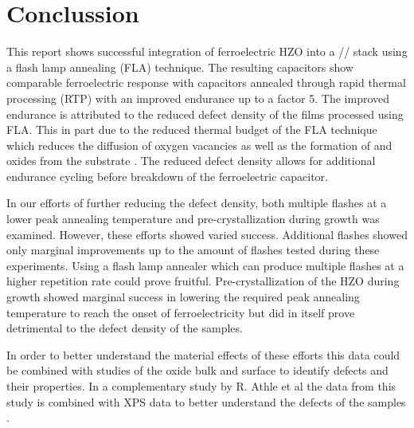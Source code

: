 \documentclass[11pt,twoside,final]{eitExjobb}  %
\begin{document}
\chapter{Conclussion}\label{chap:conc}

This report shows successful integration of ferroelectric HZO into a
// stack using a flash lamp annealing (FLA) technique. The
resulting capacitors show comparable ferroelectric response with capacitors
annealed through rapid thermal processing (RTP) with an improved endurance up
to a factor 5. The improved endurance is attributed to the reduced defect
density of the films processed using FLA. This in part due to the reduced
thermal budget of the FLA technique which reduces the diffusion of oxygen
vacancies as well as the formation of  and  oxides from the
substrate \cite{kang2016structural}. The reduced defect density allows for
additional endurance cycling before breakdown of the ferroelectric capacitor.

In our efforts of further reducing the defect density, both multiple flashes at
a lower peak annealing temperature and pre-crystallization during growth was
examined. However, these efforts showed varied success. Additional flashes
showed only marginal improvements up to the amount of flashes tested during
these experiments. Using a flash lamp annealer which can produce multiple
flashes at a higher repetition rate could prove fruitful. Pre-crystallization
of the HZO during growth showed marginal success in lowering the required peak
annealing temperature to reach the onset of ferroelectricity but did in itself
prove detrimental to the defect density of the samples.

In order to better understand the material effects of these efforts this data
could be combined with studies of the oxide bulk and surface to identify
defects and their properties. In a complementary study by R. Athle et al the
data from this study is combined with XPS data to better understand the
defects of the samples \cite{athle2022improved}.





\appendix
\end{document}
